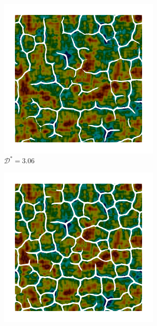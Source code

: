 \begin{figure}[!htbp]
  \centering
  \begin{subfigure}[b]{0.25\textwidth}
    \includegraphics[width=\textwidth]{Chapter4/figures/2D/Gc_exp_cartesian_5_5_rho_0_seed_b_with_crack_140.png}
    \caption{$\mathcal{D}^* = 3.06$}
    \label{fig: Chapter4/2D/Gc_exp_cartesian_5_5_rho_0_seed_a_with_crack_140}
  \end{subfigure}
  \begin{subfigure}[b]{0.25\textwidth}
    \includegraphics[width=\textwidth]{Chapter4/figures/2D/Gc_exp_cartesian_5_5_rho_0_seed_b_with_crack_160.png}

\end{subfigure}
\end{figure}
